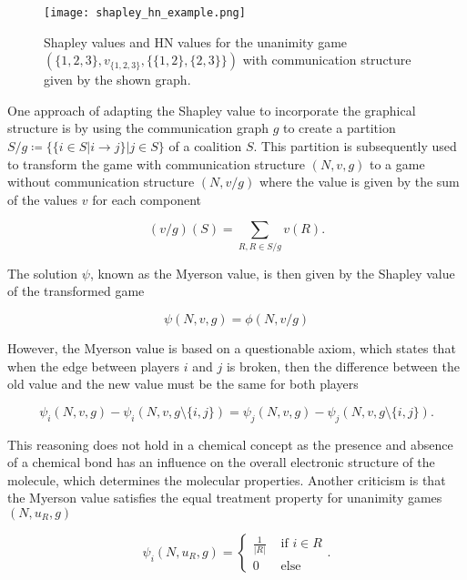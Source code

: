 \begin{figure}[h]
    \centering
    \texttt{[image: shapley\_hn\_example.png]}
    \caption{Shapley values and HN values for the unanimity game $(\{1, 2, 3\}, v_{\{1, 2, 3\}}, \{\{1, 2\}, \{2, 3\}\})$ 
            with communication structure given by the shown graph.}
    \label{fig:shapley_hn_example}
\end{figure}


One approach of adapting the Shapley value to incorporate the graphical 
structure is by using the communication graph $g$ to create a partition 
$S/g \coloneqq \{\{ i \in S| i \rightarrow j\} | j \in S\}$ of a coalition 
$S$. This partition is subsequently used to transform the game with 
communication structure $(N, v, g)$ to a game without communication structure 
$(N, v/g)$ where the value is given by the sum of the values $v$ for each component\cite{hamiache_value_1999}


\begin{equation}
    (v/g)(S) = \sum_{R, R \in S/g} v(R). 
\end{equation}


The solution $\psi$, known as the Myerson value, is then given by the Shapley value of the 
transformed game\cite{hamiache_value_1999} 


\begin{equation}
    \psi(N, v, g) = \phi(N, v/g)
\end{equation}


However, the Myerson value is based on a questionable axiom, which states that 
when the edge between players $i$ and $j$ is broken, then the difference between 
the old value and the new value must be the same for both players 


\begin{equation}
    \psi_i(N, v, g) - \psi_i(N, v, g \setminus \{i, j\}) = \psi_j(N, v, g) - \psi_j(N, v, g \setminus \{i, j\}).
\end{equation}


This reasoning does not hold in a chemical concept as the presence and absence 
of a chemical bond has an influence on the overall electronic structure 
of the molecule, which determines the molecular properties.\cite{atkins2011molecular} 
Another criticism is that the Myerson value satisfies the equal treatment 
property for unanimity games $(N, u_R, g)$\cite{hamiache_value_1999}


\begin{equation}
    \psi_i(N, u_R, g) = \begin{cases}
        \frac{1}{|R|} & \text{ if } i \in R \\
        0 & \text{ else }
    \end{cases}.
\end{equation}


